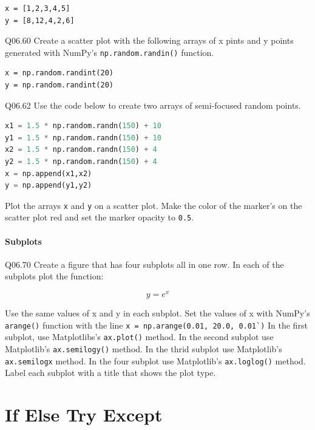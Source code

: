 \documentclass{book}
\begin{document}
\begin{lstlisting}
x = [1,2,3,4,5]
y = [8,12,4,2,6]
\end{lstlisting}

Q06.60 Create a scatter plot with the following arrays of x pints and y
points generated with NumPy's \lstinline!np.random.randin()! function.

\begin{lstlisting}
x = np.random.randint(20)
y = np.random.randint(20)
\end{lstlisting}

Q06.62 Use the code below to create two arrays of semi-focused random
points.

\begin{lstlisting}[language=Python]
x1 = 1.5 * np.random.randn(150) + 10
y1 = 1.5 * np.random.randn(150) + 10
x2 = 1.5 * np.random.randn(150) + 4
y2 = 1.5 * np.random.randn(150) + 4
x = np.append(x1,x2)
y = np.append(y1,y2)
\end{lstlisting}

Plot the arrays \lstinline!x! and \lstinline!y! on a scatter plot. Make
the color of the marker's on the scatter plot red and set the marker
opacity to \lstinline!0.5!.
    




    
        \subsubsection{Subplots}\label{subplots}

Q06.70 Create a figure that has four subplots all in one row. In each of
the subplots plot the function:

\[ y = e^x \]

Use the same values of x and y in each subplot. Set the values of x with
NumPy's \lstinline!arange()! function with the line
\lstinline!x = np.arange(0.01, 20.0, 0.01`)! In the first subplot, use
Matplotlibs's \lstinline!ax.plot()! method. In the second subplot use
Matplotlib's \lstinline!ax.semilogy()! method. In the thrid subplot use
Matplotlib's \lstinline!ax.semilogx! method. In the four subplot use
Matplotlib's \lstinline!ax.loglog()! method. Label each subplot with a
title that shows the plot type.
    




    
        \chapter{If Else Try Except}\label{if-else-try-except}
    
\end{document}
